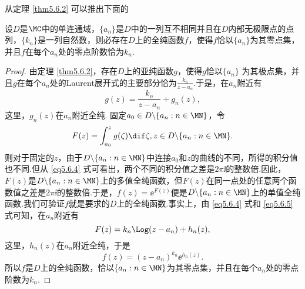从定理 \ref{thm5.6.2} 可以推出下面的
\begin{theorem}\label{thm5.6.3}
设$D$是$\MC$中的单连通域，$\{a_n\}$是$D$中的一列互不相同并且在$D$内部无极限点的点列，$\{k_n\}$是一列自然数，则必存在$D$上的全纯函数$f$，使得$f$恰以$\{a_n\}$为其零点集，并且$f$在每个$a_n$处的零点阶数恰为$k_n$.
\end{theorem}
\begin{proof}
由定理 \ref{thm5.6.2}，存在$D$上的亚纯函数$g$，使得$g$恰以$\{a_n\}$
为其极点集，并且$g$在每个$a_n$处的Laurent展开式的主要部分恰为$\frac{k_n}{z-a_n}$.于是，在$a_n$附近有
\begin{equation}\label{eq5.6.4}
g(z)=\frac{k_n}{z-a_n}+g_n(z),
\end{equation}
这里，$g_n(z)$在$a_n$附近全纯. 固定$a_0\in D\backslash\{a_n:n\in\MN\}$，令
\begin{equation}\label{eq5.6.5}
F(z)=\int_{a_0}^zg(\zeta)\dif \zeta,z\in D\backslash\{a_n:n\in\MN\}.
\end{equation}
则对于固定的$z$，由于$D\backslash\{a_n:n\in\MN\}$中连接$a_0$和$z$的曲线的不同，所得的积分值也不同.但从 \eqref{eq5.6.4} 式可看出，两个不同的积分值之差是$2\pi\ii$的整数倍.因此，$F(z)$是$D\backslash\{a_n:n\in\MN\}$上的多值全纯函数，但$F(z)$在同一点处的任意两个函数值之差是$2\pi\ii$的整数倍.于是，$f(z)=\ee^{F(z)}$便是$D\backslash\{a_n:n\in\MN\}$上的单值全纯函数.我们可验证$f$就是要求的$D$上的全纯函数.事实上，由 \eqref{eq5.6.4} 式和 \eqref{eq5.6.5} 式可知，在$a_n$附近有
\[F(z)=k_n\Log(z-a_n)+h_n(z),\]
这里，$h_n(z)$在$a_n$附近全纯，于是
\[f(z)=(z-a_n)^{k_n}\ee^{h_n(z)}.\]
所以$f$是$D$上的全纯函数，恰以$\{a_n:n\in\MN\}$为其零点集，并且在每个$a_n$处的零点阶数为$k_n$.
\end{proof}

